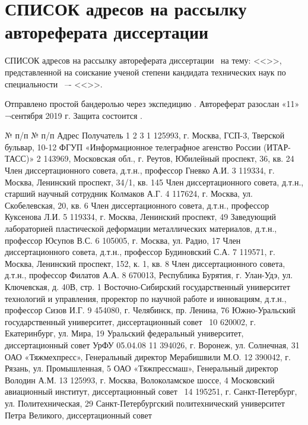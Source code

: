 

\section{СПИСОК адресов на рассылку автореферата диссертации}

СПИСОК
адресов на рассылку автореферата диссертации \thesisAuthorLastNameFromFull\ на тему: <<\thesisTitle>>, представленной на соискание ученой степени кандидата технических наук по специальности \thesisSpecialtyNumber\ –- <<\thesisSpecialtyTitle>>.


Отправлено простой бандеролью через экспедицию \thesisOrganizationShort.
Автореферат разослан «11» ¬сентября 2019 г.
Защита состоится .



№ п/п	№ п/п	Адрес	Получатель
1	2	3
1	125993, г. Москва, ГСП-3, 
Тверской бульвар, 10-12	ФГУП «Информационное телеграфное 
агенство России (ИТАР-ТАСС)»
2	143969, Московская обл., г. Реутов, Юбилейный проспект, 36, кв. 24	Член диссертационного совета, 
д.т.н., профессор Гневко А.И. 
3	119334, г. Москва, Ленинский проспект, 34/1, кв. 145	Член диссертационного совета, 
д.т.н., старший научный сотрудник 
Колмаков А.Г.
4	117624, г. Москва, ул. Скобелевская, 20, кв. 6	Член диссертационного совета, 
д.т.н., профессор Куксенова Л.И.
5	119334, г. Москва, Ленинский 
проспект, 49	Заведующий лабораторией пластической деформации металлических материалов, д.т.н., профессор Юсупов В.С.
6	105005, г. Москва, ул. Радио, 17	Член диссертационного совета, 
д.т.н., профессор Будиновский С.А.
7	119571, г. Москва, Ленинский 
проспект, 152, к. 1, кв. 8	Член диссертационного совета, 
д.т.н., профессор Филатов А.А.
8	670013, Республика Бурятия, г. Улан-Удэ, ул. Ключевская, д. 40В, стр. 1
Восточно-Сибирский государственный университет технологий и управления,
проректор по научной работе и инновациям, д.т.н., профессор Сизов И.Г.
9	454080, г. Челябинск, пр. Ленина, 76
Южно-Уральский государственный университет, диссертационный совет \
10	620002, г. Екатеринбург, ул. Мира, 19	Уральский федеральный университет,
диссертационный совет УрФУ 05.04.08
11	394026, г. Воронеж, ул. Солнечная, 31	ОАО «Тяжмехпресс»,
Генеральный директор 
Мерабишвили М.О.
12	390042, г. Рязань, ул. Промышленная, 5	ОАО «Тяжпрессмаш»,
Генеральный директор Володин А.М.
13	125993, г. Москва, 
Волоколамское шоссе, 4	Московский авиационный институт, диссертационный совет \
14	195251, г. Санкт-Петербург, 
ул. Политехническая, 29	Санкт-Петербургский политехнический университет Петра Великого, диссертационный совет \ 
